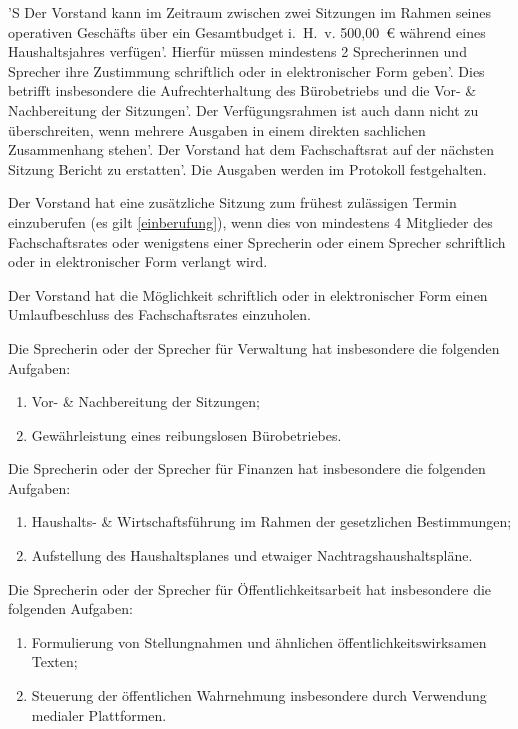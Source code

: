 \documentclass[%
	parskip=half,
]{scrartcl}
\newcommand{\edit}[1]{{\color{red} #1}}
\newcommand{\add}[1]{{\color{blue} #1}}
\begin{document}
\begin{contract}
'S \edit{Der Vorstand kann} im Zeitraum zwischen zwei Sitzungen im Rahmen \edit{seines} operativen Geschäfts
über ein Gesamtbudget i.~H.~v. \edit{500,00}~€ \add{während eines Haushaltsjahres} verfügen'. Hierfür müssen mindestens
2 \edit{Sprecherinnen und Sprecher} ihre Zustimmung schriftlich oder in elektronischer Form geben'. Dies betrifft
insbesondere die Aufrechterhaltung des Bürobetriebs und die Vor- \& Nachbereitung der Sitzungen'. Der Verfügungsrahmen
ist auch dann nicht zu überschreiten, wenn mehrere Ausgaben in einem direkten sachlichen Zusammenhang stehen'. 
\edit{Der Vorstand hat} dem Fachschaftsrat auf der nächsten Sitzung Bericht zu erstatten'. Die Ausgaben
werden im Protokoll festgehalten.

\edit{Der Vorstand hat} eine zusätzliche Sitzung zum frühest zulässigen Termin einzuberufen \add{(es gilt
\ref{einberufung})}, wenn dies von mindestens 4 Mitglieder des Fachschaftsrates oder \edit{wenigstens einer Sprecherin
oder einem Sprecher} schriftlich oder in elektronischer Form verlangt wird.

\edit{Der Vorstand hat} die Möglichkeit schriftlich oder in elektronischer Form einen Umlaufbeschluss des 
Fachschaftsrates einzuholen.

\edit{Die Sprecherin oder der Sprecher} für Verwaltung hat insbesondere die folgenden Aufgaben:
\begin{enumerate}[\qquad a)]
	\item Vor- \& Nachbereitung der Sitzungen;
	\item Gewährleistung eines reibungslosen Bürobetriebes.
\end{enumerate}

\edit{Die Sprecherin oder der Sprecher} für Finanzen hat insbesondere die folgenden Aufgaben:
\begin{enumerate}[\qquad a)]
	\item Haushalts- \& Wirtschaftsführung im Rahmen der gesetzlichen Bestimmungen;
	\item Aufstellung des Haushaltsplanes und etwaiger Nachtragshaushaltspläne.
\end{enumerate}

\add{Die Sprecherin oder der Sprecher für Öffentlichkeitsarbeit hat insbesondere die folgenden Aufgaben:
\begin{enumerate}[\qquad a)]
	\item Formulierung von Stellungnahmen und ähnlichen öffentlichkeitswirksamen Texten;
	\item Steuerung der öffentlichen Wahrnehmung insbesondere durch Verwendung medialer Plattformen.
\end{enumerate}}


\end{contract}
\end{document}
